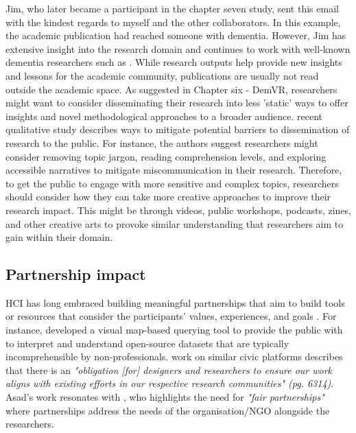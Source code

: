 Jim, who later became a participant in the chapter seven study, sent this email with the kindest regards to myself and the other collaborators. In this example, the academic publication had reached someone with dementia. However, Jim has extensive insight into the research domain and continues to work with well-known dementia researchers such as \cite{bartlett2010broadening}. While research outputs help provide new insights and lessons for the academic community, publications are usually not read outside the academic space. As suggested in Chapter six - DemVR, researchers might want to consider disseminating their research into less 'static' ways to offer insights and novel methodological approaches to a broader audience. \cite{smith2020disseminating} recent qualitative study describes ways to mitigate potential barriers to dissemination of research to the public. For instance, the authors suggest researchers might consider removing topic jargon, reading comprehension levels, and exploring accessible narratives to mitigate miscommunication in their research. Therefore, to get the public to engage with more sensitive and complex topics, researchers should consider how they can take more creative approaches to improve their research impact. This might be through videos, public workshops, podcasts, zines, and other creative arts to provoke similar understanding that researchers aim to gain within their domain.

\subsection{Partnership impact}
HCI has long embraced building meaningful partnerships that aim to build tools or resources that consider the participants' values, experiences, and goals \citep{vines_configuring_2013}. For instance, \cite{puussaar_making_2018} developed a visual map-based querying tool to provide the public with to interpret and understand open-source datasets that are typically incomprehensible by non-professionals. \cite{asad_tap_2017} work on similar civic platforms describes that there is an \textit{"obligation [for] designers and researchers to ensure our work aligns with existing efforts in our respective research communities" (pg. 6314)}. Asad's work resonates with \cite{gitau2009fair}, who highlights the need for \textit{"fair partnerships"} where partnerships address the needs of the organisation/NGO alongside the researchers.

